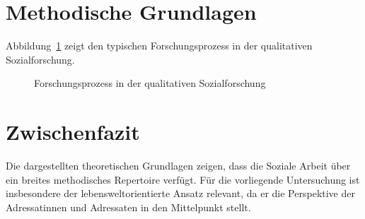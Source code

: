 \section{Methodische Grundlagen}

Abbildung~\ref{fig:prozess} zeigt den typischen Forschungsprozess in der qualitativen Sozialforschung.

\begin{figure}[htbp]
    \centering
    \caption{Forschungsprozess in der qualitativen Sozialforschung}
    \label{fig:prozess}
\end{figure}

\section{Zwischenfazit}

Die dargestellten theoretischen Grundlagen zeigen, dass die Soziale Arbeit über ein breites methodisches Repertoire verfügt. Für die vorliegende Untersuchung ist insbesondere der lebensweltorientierte Ansatz relevant, da er die Perspektive der Adressatinnen und Adressaten in den Mittelpunkt stellt.
